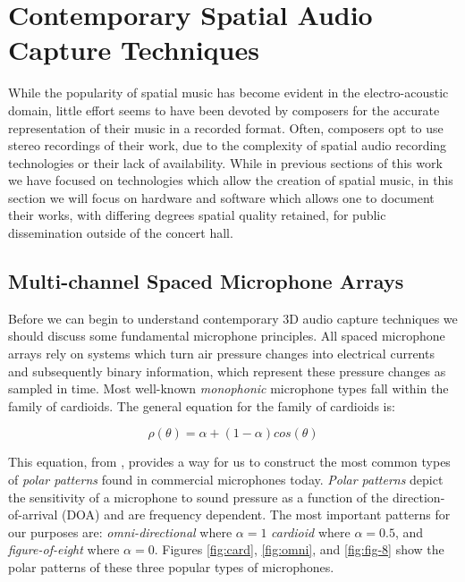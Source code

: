 \section{Contemporary Spatial Audio Capture Techniques} \label{sec:contemp_audio_capture}

While the popularity of spatial music has become evident in the electro-acoustic domain, little effort seems to have been devoted by composers for the accurate representation of their music in a recorded format. Often, composers opt to use stereo recordings of their work, due to the complexity of spatial audio recording technologies or their lack of availability. While in previous sections of this work we have focused on technologies which allow the creation of spatial music, in this section we will focus on hardware and software which allows one to document their works, with differing degrees spatial quality retained, for public dissemination outside of the concert hall. 

\subsection{Multi-channel Spaced Microphone Arrays}

Before we can begin to understand contemporary 3D audio capture techniques we should discuss some fundamental microphone principles. All spaced microphone arrays rely on systems which turn air pressure changes into electrical currents and subsequently binary information, which represent these pressure changes as sampled in time. Most well-known \textit{monophonic} microphone types fall within the family of cardioids. The general equation for the family of cardioids is:

\begin{equation}
    \rho(\theta) = \alpha + (1-\alpha)cos(\theta)
\end{equation}

This equation, from \cite{ortolani2015introduction}, provides a way for us to construct the most common types of \textit{polar patterns} found in commercial microphones today. \textit{Polar patterns} depict the sensitivity of a microphone to sound pressure as a function of the direction-of-arrival (DOA) and are frequency dependent. The most important patterns for our purposes are: \textit{omni-directional} where $\alpha=1$ \textit{cardioid} where $\alpha = 0.5$, and \textit{figure-of-eight} where $\alpha=0$. Figures \ref{fig:card}, \ref{fig:omni}, and \ref{fig:fig-8} show the polar patterns of these three popular types of microphones. 

